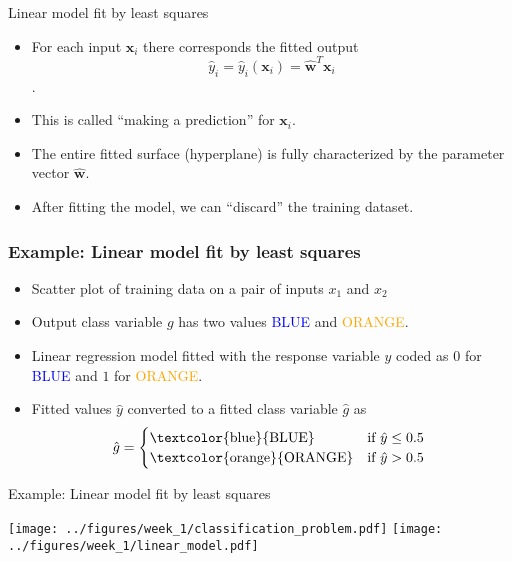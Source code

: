 \documentclass[notes]{beamer}          %
\newcommand{\vect}[1]{\bm{#1}}
\begin{document}
\begin{frame}{Linear model fit by least squares}
    \begin{itemize}
        \item For each input $\vect{x}_i$ there corresponds the fitted output $$\hat{y}_i = \hat{y}_i(\vect{x}_i) = \hat{\vect{w}}^T\vect{x}_i$$.
        \item This is called ``making a prediction'' for $\vect{x}_i$.

        \item The entire fitted surface (hyperplane) is fully characterized by the parameter vector $\hat{\vect{w}}$.

        \item After fitting the model, we can ``discard'' the training dataset.
    \end{itemize}
\end{frame}

\begin{frame}
\frametitle{Example: Linear model fit by least squares}
\begin{itemize}
    \item Scatter plot of training data on a pair of inputs $x_1$ and $x_2$
    \item Output class variable $g$ has two values \textcolor{blue}{BLUE} and \textcolor{orange}{ORANGE}.
    \item Linear regression model fitted with the response variable $y$ coded as $0$ for \textcolor{blue}{BLUE} and $1$ for \textcolor{orange}{ORANGE}.
    \item Fitted values $\hat{y}$ converted to a fitted class variable $\hat{g}$ as
    \[ \hat{g} = \begin{cases}
                    \text{\textcolor{blue}{BLUE}}  & \text{if $\hat{y} \leq 0.5$} \\
                    \text{\textcolor{orange}{ORANGE}} & \text{if $\hat{y} > 0.5$ }
                 \end{cases} \]

\end{itemize}
\end{frame}

\begin{frame}{Example: Linear model fit by least squares}
    \begin{center}
        \texttt{[image: ../figures/week\_1/classification\_problem.pdf]}
        \hfill
        \texttt{[image: ../figures/week\_1/linear\_model.pdf]}
        \end{center}
\end{frame}
\end{document}
